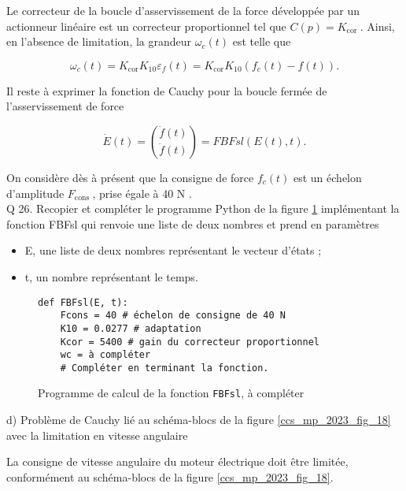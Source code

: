 Le correcteur de la boucle d'asservissement de la force développée par un actionneur linéaire est un correcteur proportionnel tel que $C(p)=K_{\text {cor }}$. Ainsi, en l'absence de limitation, la grandeur $\omega_{c}(t)$ est telle que

$$
\omega_{c}(t)=K_{\operatorname{cor}} K_{10} \varepsilon_{f}(t)=K_{\operatorname{cor}} K_{10}\left(f_{c}(t)-f(t)\right) .
$$

Il reste à exprimer la fonction de Cauchy pour la boucle fermée de l'asservissement de force

$$
\dot{E}(t)=\binom{\dot{f}(t)}{\ddot{f}(t)}=F B F s l(E(t), t) .
$$

On considère dès à présent que la consigne de force $f_{c}(t)$ est un échelon d'amplitude $F_{\text {cons }}$, prise égale à 40 N .\\
Q 26. Recopier et compléter le programme Python de la figure \ref{ccs_mp_2023_fig_19} implémentant la fonction FBFsl qui renvoie une liste de deux nombres et prend en paramètres
\question{\label{ccs_mp_2023_q_}
}
\ifprof
\begin{corrige}
\end{corrige}
\else
\fi



\begin{itemize}
  \item E, une liste de deux nombres représentant le vecteur d'états ;
  \item t, un nombre représentant le temps.
\end{itemize}



\begin{figure}[!h]
\begin{lstlisting}
def FBFsl(E, t):
    Fcons = 40 # échelon de consigne de 40 N
    K10 = 0.0277 # adaptation
    Kcor = 5400 # gain du correcteur proportionnel
    wc = à compléter
    # Compléter en terminant la fonction.
\end{lstlisting}
\caption{\label{ccs_mp_2023_fig_19}  Programme de calcul de la fonction \lstinline{FBFsl}, à compléter}
\end{figure}


d) Problème de Cauchy lié au schéma-blocs de la figure \ref{ccs_mp_2023_fig_18} avec la limitation en vitesse angulaire

La consigne de vitesse angulaire du moteur électrique doit être limitée, conformément au schéma-blocs de la figure \ref{ccs_mp_2023_fig_18}.\\


